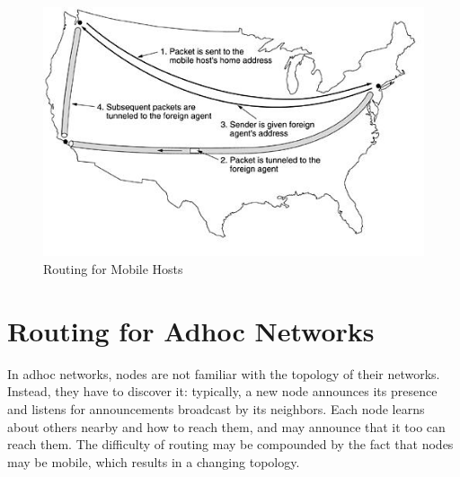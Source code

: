 \documentclass[twoside]{article}
\begin{document}
\newpage \begin{figure}
    \centering
    \includegraphics[width=\textwidth]{images/rfmh2.JPG}
    \caption{Routing for Mobile Hosts}
\end{figure}

\section*{Routing for Adhoc Networks}
In adhoc networks, nodes are not familiar with the topology of their networks. Instead, they have to discover it: typically, a new node announces its presence and listens for announcements broadcast by its neighbors. Each node learns about others nearby and how to reach them, and may announce that it too can reach them. The difficulty of routing may be compounded by the fact that nodes may be mobile, which results in a changing topology.
\end{document}
